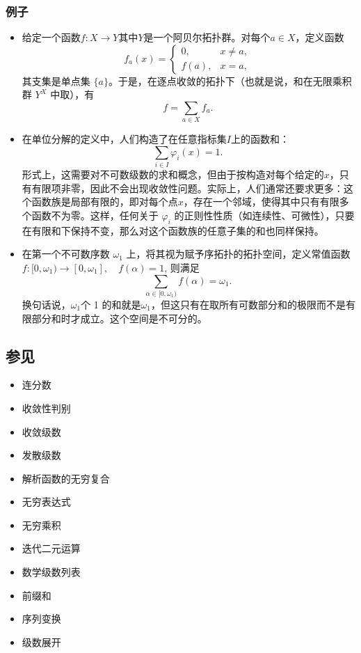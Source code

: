 \subsubsection{例子}
\begin{itemize}
\item 给定一个函数$f: X \to Y$其中$Y$是一个阿贝尔拓扑群。对每个$a \in X$，定义函数
$$
f_{a}(x) =
\begin{cases}
0, & x \neq a, \\
f(a), & x = a,
\end{cases}~
$$
其支集是单点集 $\{a\}$。于是，在逐点收敛的拓扑下（也就是说，和在无限乘积群 $Y^{X}$ 中取），有
$$
f = \sum_{a \in X} f_{a}.~
$$
\item 在单位分解的定义中，人们构造了在任意指标集$I$上的函数和：
$$
\sum_{i \in I} \varphi_{i}(x) = 1.~
$$
形式上，这需要对不可数级数的求和概念，但由于按构造对每个给定的$x$，只有有限项非零，因此不会出现收敛性问题。实际上，人们通常还要求更多：这个函数族是局部有限的，即对每个点$x$，存在一个邻域，使得其中只有有限多个函数不为零。这样，任何关于 $\varphi_{i}$ 的正则性性质（如连续性、可微性），只要在有限和下保持不变，那么对这个函数族的任意子集的和也同样保持。
\item 在第一个不可数序数 $\omega_{1}$ 上，将其视为赋予序拓扑的拓扑空间，定义常值函数$f: [0, \omega_{1}) \to [0, \omega_{1}], \quad f(\alpha) = 1$,
则满足
$$
\sum_{\alpha \in [0, \omega_{1})} f(\alpha) = \omega_{1}.~
$$
换句话说，$\omega_{1}$个 1 的和就是$\omega_{1}$，但这只有在取所有可数部分和的极限而不是有限部分和时才成立。这个空间是不可分的。
\end{itemize}
\subsection{参见}
\begin{itemize}
\item 连分数
\item 收敛性判别
\item 收敛级数
\item 发散级数
\item 解析函数的无穷复合
\item 无穷表达式
\item 无穷乘积
\item 迭代二元运算
\item 数学级数列表
\item 前缀和
\item 序列变换
\item 级数展开
\end{itemize}
